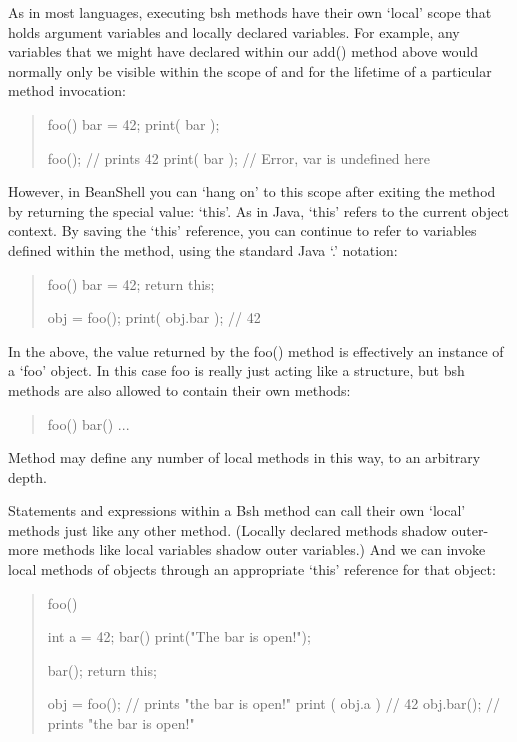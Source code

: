 \documentclass[twoside,11pt,nolof]{starlink}
\begin{document}
As in most languages, executing bsh methods have their own `local' scope
that holds argument variables and locally declared variables.  For example,
any variables that we might have declared within our add() method above would
normally only be visible within the scope of and for the lifetime of a
particular method invocation:
\begin{quote}
\begin{terminalv}
    foo() {
        bar = 42;
        print( bar );
    }

    foo();  // prints 42
    print( bar ); // Error, var is undefined here
\end{terminalv}
\end{quote}
However, in BeanShell you can `hang on' to this scope after exiting
the method by returning the special value: `this'.  As in Java, `this'
refers to the current object context.  By saving the `this' reference,
you can continue to refer to variables defined within the method,
using the standard Java `.' notation:
\begin{quote}
\begin{terminalv}
    foo() {
        bar = 42;
        return this;
    }

    obj = foo();
    print( obj.bar ); // 42
\end{terminalv}
\end{quote}

In the above, the value returned by the foo() method is effectively an
instance of a `foo' object.  In this case foo is really just acting
like a structure, but bsh methods are also allowed to contain their
own methods:
\begin{quote}
\begin{terminalv}
    foo() {
        bar() {
            ...
        }
    }
\end{terminalv}
\end{quote}
Method may define any number of local methods in this way, to an arbitrary
depth.

Statements and expressions within a Bsh method can call their own
`local' methods just like any other method.  (Locally declared methods
shadow outer-more methods like local variables shadow outer
variables.)  And we can invoke local methods of objects through an
appropriate `this' reference for that object:
\begin{quote}
\begin{terminalv}
    foo() {
        int a = 42;
        bar() {
            print("The bar is open!");
        }

        bar();
        return this;
    }

    obj = foo();     // prints "the bar is open!"
    print ( obj.a )  // 42
    obj.bar();       // prints "the bar is open!"
\end{terminalv}
\end{quote}
\end{document}
